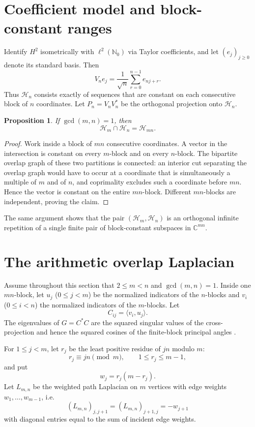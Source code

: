\documentclass[11pt]{article}
\newtheorem{proposition}[theorem]{Proposition}
\theoremstyle{remark}
\newcommand{\Hsq}{H^2}
\newcommand{\1}{\mathbf 1}
\begin{document}
\section{Coefficient model and block-constant ranges}
Identify $\Hsq$ isometrically with $\ell^2(\mathbb N_0)$ via Taylor
coefficients, and let $(e_j)_{j\ge0}$ denote its standard basis. Then
\[
V_ne_j=\frac1{\sqrt n}\sum_{r=0}^{n-1}e_{nj+r}.
\]
Thus $\mathcal H_n$ consists exactly of sequences that are constant on each
consecutive block of $n$ coordinates. Let $P_n=V_nV_n^*$ be the orthogonal
projection onto $\mathcal H_n$.

\begin{proposition}\label{prop:intersection}
If $\gcd(m,n)=1$, then
\[
\mathcal H_m\cap\mathcal H_n=\mathcal H_{mn}.
\]
\end{proposition}

\begin{proof}
Work inside a block of $mn$ consecutive coordinates. A vector in the
intersection is constant on every $m$-block and on every $n$-block. The
bipartite overlap graph of these two partitions is connected: an interior
cut separating the overlap graph would have to occur at a coordinate that is
simultaneously a multiple of $m$ and of $n$, and coprimality excludes such a
coordinate before $mn$. Hence the vector is constant on the entire
$mn$-block. Different $mn$-blocks are independent, proving the claim.
\end{proof}

The same argument shows that the pair $(\mathcal H_m,\mathcal H_n)$ is an
orthogonal infinite repetition of a single finite pair of block-constant
subspaces in $\mathbb C^{mn}$.

\section{The arithmetic overlap Laplacian}
Assume throughout this section that $2\le m<n$ and $\gcd(m,n)=1$. Inside
one $mn$-block, let $u_j$ ($0\le j<m$) be the normalized indicators of the
$n$-blocks and $v_i$ ($0\le i<n$) the normalized indicators of the
$m$-blocks. Let
\[
C_{ij}=\langle v_i,u_j\rangle.
\]
The eigenvalues of $G=C^*C$ are the squared singular values of the
cross-projection and hence the squared cosines of the finite-block principal
angles \cite{BjorckGolub1973}.

For $1\le j<m$, let $r_j$ be the least positive residue of $jn$ modulo $m$:
\[
r_j\equiv jn\pmod m,\qquad 1\le r_j\le m-1,
\]
and put
\[
w_j=r_j(m-r_j).
\]
Let $L_{m,n}$ be the weighted path Laplacian on $m$ vertices with edge
weights $w_1,\ldots,w_{m-1}$, i.e.
\[
(L_{m,n})_{j,j+1}=(L_{m,n})_{j+1,j}=-w_{j+1}
\]
with diagonal entries equal to the sum of incident edge weights.
\end{document}
